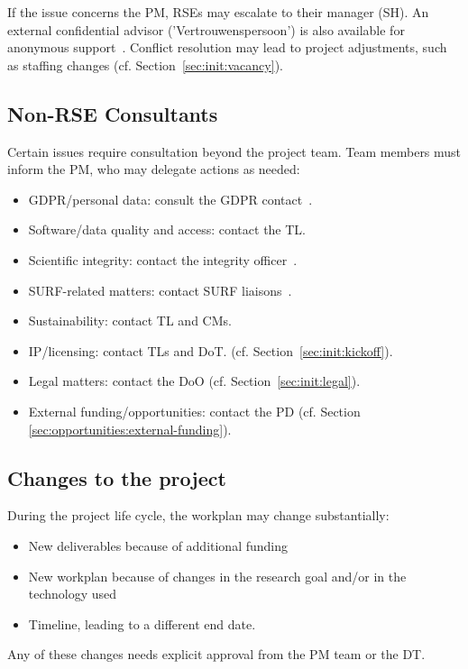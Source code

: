 If the issue concerns the PM, RSEs may escalate to their manager (SH). An external confidential advisor ('Vertrouwenspersoon') is also available for anonymous support~\cite{intranet}. 
Conflict resolution may lead to project adjustments, such as staffing changes (cf. Section~\ref{sec:init:vacancy}).

\subsection{Non-RSE Consultants}
\label{sec:exec:consult}
Certain issues require consultation beyond the project team. Team members must inform the PM, who may delegate actions as needed:

\begin{itemize}\itemsep0em
\item GDPR/personal data: consult the GDPR contact~\cite{intranet}. 
\item Software/data quality and access: contact the TL.
\item Scientific integrity: contact the integrity officer~\cite{intranet}.
\item SURF-related matters: contact SURF liaisons~\cite{intranet}.
\item Sustainability: contact TL and CMs.
\item IP/licensing: contact TLs and DoT. (cf. Section~\ref{sec:init:kickoff}).
\item Legal matters: contact the DoO (cf. Section~\ref{sec:init:legal}).
\item External funding/opportunities: contact the PD (cf. Section \ref{sec:opportunities:external-funding}).
\end{itemize}

\subsection{Changes to the project}
\label{sec:exec:changes}
During the project life cycle, the workplan may change substantially:

\begin{itemize}\itemsep0em
\item New deliverables because of additional funding
\item New workplan because of changes in the research goal and/or in the technology used
\item Timeline, leading to a different end date.
\end{itemize}

Any of these changes needs explicit approval from the PM team or the DT.


